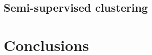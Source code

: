 \documentclass{article}
\begin{document}
\subsection{Semi-supervised clustering}



\section{Conclusions}
\label{conclusions}






\end{document}
